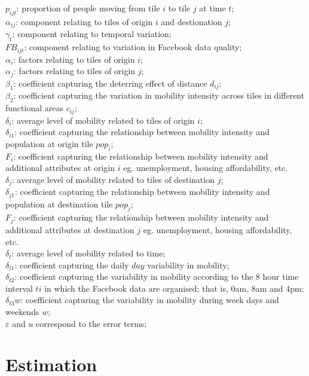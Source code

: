 \documentclass[11pt,letterpaper]{article}
\begin{document}
$p_{ijt}$: proportion of people moving from tile $i$ to tile $j$ at time $t$;\\
$\alpha_{ij}$: component relating to tiles of origin $i$ and destionation $j$;\\
$\gamma_{t}$: component relating to temporal variation;\\
$FB_{ijt}$: component relating to variation in Facebook data quality;\\
$\alpha_{i}$: factors relating to tiles of origin $i$;\\
$\alpha_{j}$: factors relating to tiles of origin $j$;\\
$\beta_{1}$: coefficient capturing the deterring effect of distance $d_{ij}$;\\
$\beta_{2}$: coefficient capturing the variation in mobility intensity across tiles in different functional areas $c_{ij}$;\\
$\delta_{i}$: average level of mobility related to tiles of origin $i$;\\
$\delta_{i1}$: coefficient capturing the relationship between mobility intensity and population at origin tile $pop_{i}$;\\
$F_{i}$: coefficient capturing the relationship between mobility intensity and additional attributes at origin $i$ eg. unemployment, housing affordability, etc.\\ 
$\delta_{j}$: average level of mobility related to tiles of destination $j$;\\
$\delta_{j1}$: coefficient capturing the relationship between mobility intensity and population at destination tile $pop_{j}$;\\
$F_{j}$: coefficient capturing the relationship between mobility intensity and additional attributes at destination $j$ eg. unemployment, housing affordability, etc.\\ 
$\delta_{t}$: average level of mobility related to time;\\
$\delta_{t1}$: coefficient capturing the daily $day$ variability in mobility;\\
$\delta_{t2}$: coefficient capturing the variability in mobility according to the 8 hour time interval $ti$ in which the Facebook data are organised; that is, 0am, 8am and 4pm;\\
$\delta_{t3}w$: coefficient capturing the variability in mobility during week days and weekends $w$;\\
$\varepsilon$ and $u$ correspond to the error terms;

\section*{Estimation}
\end{document}
